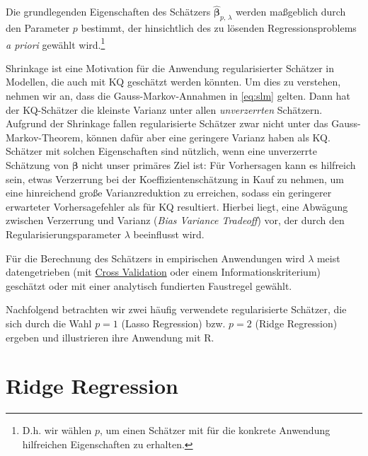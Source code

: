 \documentclass[
  a4paper,
  DIV=11,
  oneside]{scrreprt}
\begin{document}
Die grundlegenden Eigenschaften des Schätzers
\(\widehat{\boldsymbol{\beta}}_{p,\,\lambda}\) werden maßgeblich durch
den Parameter \(p\) bestimmt, der hinsichtlich des zu lösenden
Regressionsproblems \emph{a priori} gewählt wird.\footnote{D.h. wir
  wählen \(p\), um einen Schätzer mit für die konkrete Anwendung
  hilfreichen Eigenschaften zu erhalten.}

Shrinkage ist eine Motivation für die Anwendung regularisierter Schätzer
in Modellen, die auch mit KQ geschätzt werden könnten. Um dies zu
verstehen, nehmen wir an, dass die Gauss-Markov-Annahmen in
\eqref{eq:slm} gelten. Dann hat der KQ-Schätzer die kleinste Varianz
unter allen \emph{unverzerrten} Schätzern. Aufgrund der Shrinkage fallen
regularisierte Schätzer zwar nicht unter das Gauss-Markov-Theorem,
können dafür aber eine geringere Varianz haben als KQ. Schätzer mit
solchen Eigenschaften sind nützlich, wenn eine unverzerrte Schätzung von
\(\boldsymbol{\beta}\) nicht unser primäres Ziel ist: Für Vorhersagen
kann es hilfreich sein, etwas Verzerrung bei der Koeffizientenschätzung
in Kauf zu nehmen, um eine hinreichend große Varianzreduktion zu
erreichen, sodass ein geringerer erwarteter Vorhersagefehler als für KQ
resultiert. Hierbei liegt, eine Abwägung zwischen Verzerrung und Varianz
(\emph{Bias Variance Tradeoff}) vor, der durch den
Regularisierungsparameter \(\lambda\) beeinflusst wird.

Für die Berechnung des Schätzers in empirischen Anwendungen wird
\(\lambda\) meist datengetrieben (mit
\href{https://de.wikipedia.org/wiki/Kreuzvalidierungsverfahren}{Cross
Validation} oder einem Informationskriterium) geschätzt oder mit einer
analytisch fundierten Faustregel gewählt.

Nachfolgend betrachten wir zwei häufig verwendete regularisierte
Schätzer, die sich durch die Wahl \(p=1\) (Lasso Regression) bzw.
\(p=2\) (Ridge Regression) ergeben und illustrieren ihre Anwendung mit
R.

\hypertarget{ridge-regression}{%
\section{Ridge Regression}\label{ridge-regression}}
\end{document}
